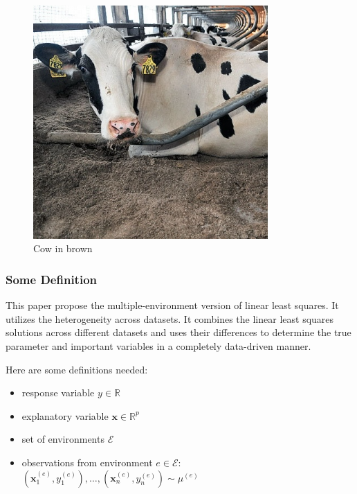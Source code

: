 \begin{frame}
\begin{minipage}{.3\textwidth}
\begin{figure}[H]
      \centering \includegraphics[width=0.8\textwidth]{figs/cow_sand.jpeg}
      \caption{Cow in brown}
    \end{figure}
  \end{minipage}
\end{frame}


\begin{frame}
  \frametitle{Some Definition}
  This paper propose the multiple-environment version of linear least squares. It utilizes the heterogeneity across datasets.
  It combines the linear least squares solutions across different datasets and uses their differences to determine the true parameter and important variables in a completely data-driven manner.
  
  \vspace{8pt}
  
  Here are some definitions needed: 
    \begin{itemize}
    \item response variable $y \in \mathbb R$
    \item explanatory variable $\bm x \in \mathbb R^p$
    \item set of environments $\mathcal E$
    \item observations from environment $e\in \mathcal E$:
      $(\bm x_1^{(e)}, y_1^{(e)}), \dots,  (\bm x_n^{(e)}, y_n^{(e)}) \sim \mu^{(e)}$
    \end{itemize}
    
\end{frame}

